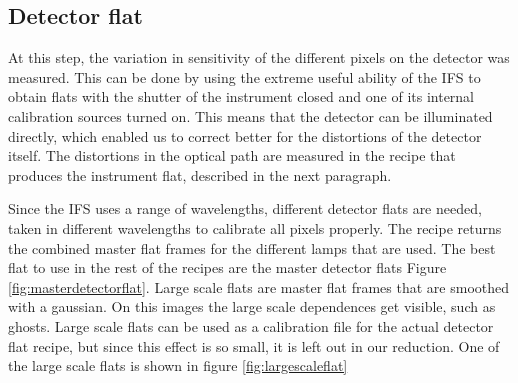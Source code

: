 \documentclass[twoside,single]{lion-msc}
\begin{document}
\subsection{Detector flat}
At this step, the variation in sensitivity of the different pixels on the detector was measured. This can be done by using the extreme useful ability of the IFS to obtain flats with the shutter of the instrument closed and one of its internal calibration sources turned on. This means that the detector can be illuminated directly, which enabled us to correct better for the distortions of the detector itself. The distortions in the optical path are measured in the recipe that produces the instrument flat, described in the next paragraph. 
\bigskip

Since the IFS uses a range of wavelengths, different detector flats are needed, taken in different wavelengths to calibrate all pixels properly. The recipe returns the combined master flat frames for the different lamps that are used. The best flat to use in the rest of the recipes are the master detector flats Figure \ref{fig:masterdetectorflat}. Large scale flats are master flat frames that are smoothed with a gaussian. On this images the large scale dependences get visible, such as ghosts. Large scale flats can be used as a calibration file for the actual detector flat recipe, but since this effect is so small, it is left out in our reduction. One of the large scale flats is shown in figure \ref{fig:largescaleflat}
\end{document}
